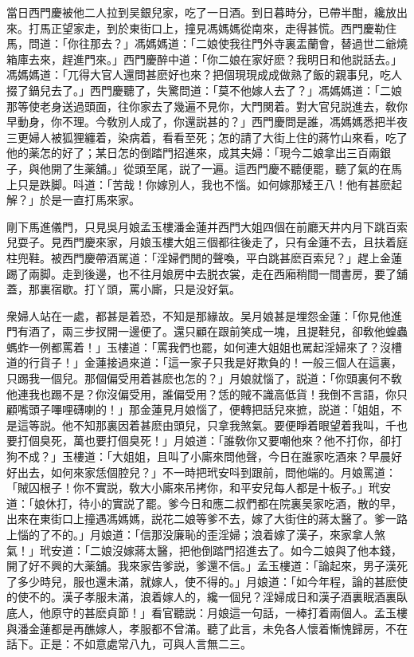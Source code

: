 當日西門慶被他二人拉到吴銀兒家，吃了一日酒。到日暮時分，已帶半酣，纔放出來。打馬正望家走，到於東街口上，撞見馮媽媽從南來，走得甚慌。西門慶勒住馬，問道：「你往那去？」馮媽媽道：「二娘使我往門外寺裏盂蘭會，替過世二爺燒箱庫去來，趕進門來。」西門慶醉中道：「你二娘在家好麽？我明日和他説話去。」馮媽媽道：「兀得大官人還問甚麽好也來？把個現現成成做熟了飯的親事兒，吃人掇了鍋兒去了。」西門慶聽了，失驚問道：「莫不他嫁人去了？」馮媽媽道：「二娘那等使老身送過頭面，往你家去了幾遍不見你，大門関着。對大官兒説進去，敎你早動身，你不理。今敎別人成了，你還説甚的？」西門慶問是誰，馮媽媽悉把半夜三更婦人被狐狸纏着，染病着，看看至死；怎的請了大街上住的蔣竹山來看，吃了他的薬怎的好了；某日怎的倒踏門招進來，成其夫婦：「現今二娘拿出三百兩銀子，與他開了生薬舖。」從頭至尾，説了一遍。這西門慶不聽便罷，聽了氣的在馬上只是跌脚。呌道：「苦哉！你嫁別人，我也不惱。如何嫁那矮王八！他有甚麽起解？」於是一直打馬來家。

剛下馬進儀門，只見吳月娘孟玉樓潘金蓮并西門大姐四個在前廳天井内月下跳百索兒耍子。見西門慶來家，月娘玉樓大姐三個都往後走了，只有金蓮不去，且扶着庭柱兜鞋。被西門慶帶酒駡道：「淫婦們閒的聲喚，平白跳甚麽百索兒？」趕上金蓮踢了兩脚。走到後邊，也不往月娘房中去脱衣裳，走在西廂稍間一間書房，要了舖蓋，那裏宿歇。打丫頭，罵小廝，只是没好氣。

衆婦人站在一處，都甚是着恐，不知是那緣故。吴月娘甚是埋怨金蓮：「你見他進門有酒了，兩三步扠開一邊便了。還只顧在跟前笑成一塊，且提鞋兒，卻敎他蝗蟲螞蚱一例都罵着！」玉樓道：「罵我們也罷，如何連大姐姐也駡起淫婦來了？沒槽道的行貨子！」金蓮接過來道：「這一家子只我是好欺負的！一般三個人在這裏，只踢我一個兒。那個偏受用着甚麽也怎的？」月娘就惱了，説道：「你頭裏何不敎他連我也踢不是？你沒偏受用，誰偏受用？恁的賊不識高低貨！我倒不言語，你只顧嘴頭子嗶哩礴喇的！」那金蓮見月娘惱了，便轉把話兒來摭，説道：「姐姐，不是這等説。他不知那裏因着甚麽由頭兒，只拿我煞氣。要便睜着眼望着我叫，千也要打個臭死，萬也要打個臭死！」月娘道：「誰敎你又要嘲他來？他不打你，卻打狗不成？」玉樓道：「大姐姐，且叫了小廝來問他聲，今日在誰家吃酒來？早晨好好出去，如何來家恁個腔兒？」不一時把玳安呌到跟前，問他端的。月娘罵道：「賊囚根子！你不實説，敎大小廝來吊拷你，和平安兒每人都是十板子。」玳安道：「娘休打，待小的實説了罷。爹今日和應二叔們都在院裏吴家吃酒，散的早，出來在東街口上撞遇馮媽媽，説花二娘等爹不去，嫁了大街住的蔣太醫了。爹一路上惱的了不的。」月娘道：「信那没廉恥的歪淫婦；浪着嫁了漢子，來家拿人煞氣！」玳安道：「二娘沒嫁蔣太醫，把他倒踏門招進去了。如今二娘與了他本錢，開了好不興的大薬舖。我來家告爹説，爹還不信。」孟玉樓道：「論起來，男子漢死了多少時兒，服也還未滿，就嫁人，使不得的。」月娘道：「如今年程，論的甚麽使的使不的。漢子孝服未滿，浪着嫁人的，纔一個兒？淫婦成日和漢子酒裏眠酒裏臥底人，他原守的甚麽貞節！」看官聽説：月娘這一句話，一棒打着兩個人。孟玉樓與潘金蓮都是再醮嫁人，孝服都不曾滿。聽了此言，未免各人懷着慚愧歸房，不在話下。正是：不如意處常八九，可與人言無二三。

